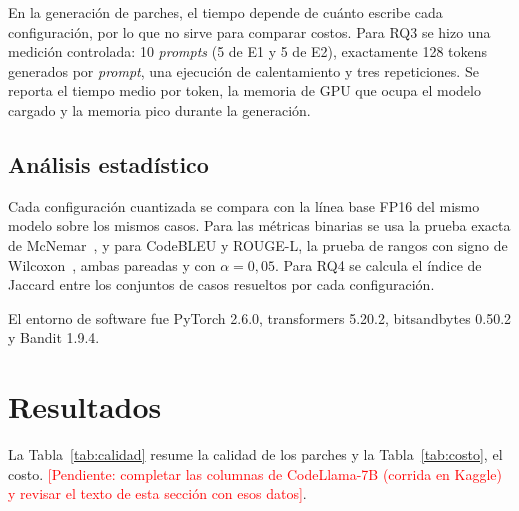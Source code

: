 \documentclass[conference]{IEEEtran}
\newcommand{\pend}[1]{\textcolor{red}{[Pendiente: #1]}}
\begin{document}
En la generación de parches, el tiempo depende de cuánto escribe cada configuración, por lo que no sirve para comparar costos. Para RQ3 se hizo una medición controlada: 10 \emph{prompts} (5 de E1 y 5 de E2), exactamente 128 tokens generados por \emph{prompt}, una ejecución de calentamiento y tres repeticiones. Se reporta el tiempo medio por token, la memoria de GPU que ocupa el modelo cargado y la memoria pico durante la generación.

\subsection{Análisis estadístico}

Cada configuración cuantizada se compara con la línea base FP16 del mismo modelo sobre los mismos casos. Para las métricas binarias se usa la prueba exacta de McNemar~\cite{mcnemar1947note}, y para CodeBLEU y ROUGE-L, la prueba de rangos con signo de Wilcoxon~\cite{wilcoxon1945individual}, ambas pareadas y con $\alpha = 0{,}05$. Para RQ4 se calcula el índice de Jaccard entre los conjuntos de casos resueltos por cada configuración.

El entorno de software fue PyTorch 2.6.0, transformers 5.20.2, bitsandbytes 0.50.2 y Bandit 1.9.4.

\section{Resultados}\label{sec:resultados}

La Tabla~\ref{tab:calidad} resume la calidad de los parches y la Tabla~\ref{tab:costo}, el costo. \pend{completar las columnas de CodeLlama-7B (corrida en Kaggle) y revisar el texto de esta sección con esos datos}.
\end{document}
